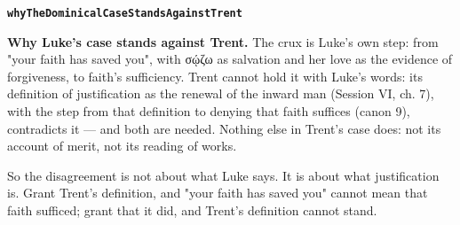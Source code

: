 \documentclass[11pt]{article}
\begin{document}
\par\medskip\noindent\textbf{\texttt{why\allowbreak{}The\allowbreak{}Dominical\allowbreak{}Case\allowbreak{}Stands\allowbreak{}Against\allowbreak{}Trent}}\par\nobreak\noindent
\textbf{Why Luke's case stands against Trent.} The crux is Luke's own step: from "your faith has saved you", with σῴζω as salvation and her love as the evidence of forgiveness, to faith's sufficiency. Trent cannot hold it with Luke's words: its definition of justification as the renewal of the inward man (Session VI, ch. 7), with the step from that definition to denying that faith suffices (canon 9), contradicts it — and both are needed. Nothing else in Trent's case does: not its account of merit, not its reading of works.

So the disagreement is not about what Luke says. It is about what justification is. Grant Trent's definition, and "your faith has saved you" cannot mean that faith sufficed; grant that it did, and Trent's definition cannot stand.
\end{document}
